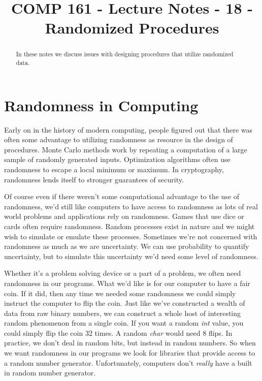 \documentclass[]{tufte-handout}
\title{COMP 161 - Lecture Notes - 18 - Randomized Procedures}
\begin{document}
 
\maketitle

\begin{abstract}
In these notes we discuss issues with designing procedures that utilize randomized data.
\end{abstract}


\section{Randomness in Computing}

Early on in the history of modern computing, people figured out that there was often some advantage to utilizing randomness as resource in the design of procedures.  Monte Carlo methods work by repeating a computation of a large sample of randomly generated inputs. Optimization algorithms often use randomness to escape a local minimum or maximum.  In cryptography, randomness lends itself to stronger guarantees of security.  

Of course even if there weren't some computational advantage to the use of randomness, we'd still like computers to have access to randomness as lots of real world problems and applications rely on randomness. Games that use dice or cards often require randomness. Random processes exist in nature and we might wish to simulate or emulate these processes.  Sometimes we're not concerned with randomness as much as we are uncertainty. We can use probability to quantify uncertainty, but to simulate this uncertainty we'd need some level of randomness. 

Whether it's a problem solving device or a part of a problem, we often need randomness in our programs. What we'd like is for our computer to have a fair coin. If it did, then any time we needed some randomness we could simply instruct the computer to flip the coin.  Just like we've constructed a wealth of data from raw binary numbers, we can construct a whole host of interesting random phenomenon  from a single coin. If you want a random \textit{int} value, you could simply flip the coin 32 times. A random \textit{char} would need 8 flips.  In practice, we don't deal in random bits, but instead in random numbers.  So when we want randomness in our programs we look for libraries that provide access to a random number generator.  Unfortunately, computers don't \textit{really} have a built in random number generator.
\end{document}
